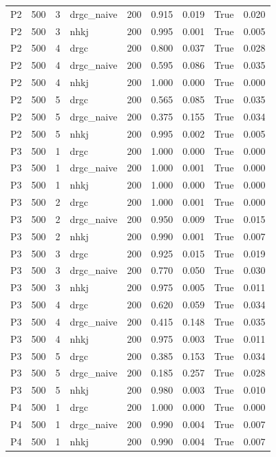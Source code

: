 \begin{table}[htbp]
\begin{tabular}{lcclccccc}
P2 & 500 & 3 & drgc\_naive & 200 & 0.915 & 0.019 & True & 0.020 \\
P2 & 500 & 3 & nhkj & 200 & 0.995 & 0.001 & True & 0.005 \\
P2 & 500 & 4 & drgc & 200 & 0.800 & 0.037 & True & 0.028 \\
P2 & 500 & 4 & drgc\_naive & 200 & 0.595 & 0.086 & True & 0.035 \\
P2 & 500 & 4 & nhkj & 200 & 1.000 & 0.000 & True & 0.000 \\
P2 & 500 & 5 & drgc & 200 & 0.565 & 0.085 & True & 0.035 \\
P2 & 500 & 5 & drgc\_naive & 200 & 0.375 & 0.155 & True & 0.034 \\
P2 & 500 & 5 & nhkj & 200 & 0.995 & 0.002 & True & 0.005 \\
P3 & 500 & 1 & drgc & 200 & 1.000 & 0.000 & True & 0.000 \\
P3 & 500 & 1 & drgc\_naive & 200 & 1.000 & 0.001 & True & 0.000 \\
P3 & 500 & 1 & nhkj & 200 & 1.000 & 0.000 & True & 0.000 \\
P3 & 500 & 2 & drgc & 200 & 1.000 & 0.001 & True & 0.000 \\
P3 & 500 & 2 & drgc\_naive & 200 & 0.950 & 0.009 & True & 0.015 \\
P3 & 500 & 2 & nhkj & 200 & 0.990 & 0.001 & True & 0.007 \\
P3 & 500 & 3 & drgc & 200 & 0.925 & 0.015 & True & 0.019 \\
P3 & 500 & 3 & drgc\_naive & 200 & 0.770 & 0.050 & True & 0.030 \\
P3 & 500 & 3 & nhkj & 200 & 0.975 & 0.005 & True & 0.011 \\
P3 & 500 & 4 & drgc & 200 & 0.620 & 0.059 & True & 0.034 \\
P3 & 500 & 4 & drgc\_naive & 200 & 0.415 & 0.148 & True & 0.035 \\
P3 & 500 & 4 & nhkj & 200 & 0.975 & 0.003 & True & 0.011 \\
P3 & 500 & 5 & drgc & 200 & 0.385 & 0.153 & True & 0.034 \\
P3 & 500 & 5 & drgc\_naive & 200 & 0.185 & 0.257 & True & 0.028 \\
P3 & 500 & 5 & nhkj & 200 & 0.980 & 0.003 & True & 0.010 \\
P4 & 500 & 1 & drgc & 200 & 1.000 & 0.000 & True & 0.000 \\
P4 & 500 & 1 & drgc\_naive & 200 & 0.990 & 0.004 & True & 0.007 \\
P4 & 500 & 1 & nhkj & 200 & 0.990 & 0.004 & True & 0.007 \\

\end{tabular}
\end{table}
